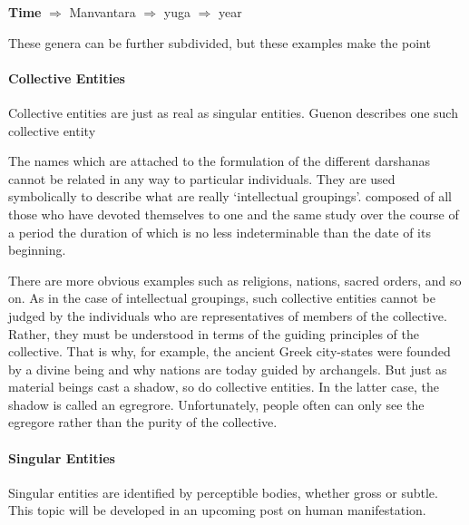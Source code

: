 \textbf{Time} $\Rightarrow $ Manvantara $\Rightarrow $ yuga $\Rightarrow $ year

These genera can be further subdivided, but these examples make the point

\paragraph{Collective Entities}
Collective entities are just as real as singular entities. Guenon describes one such collective entity

\begin{quotex}
The names which are attached to the formulation of the different darshanas cannot be related in any way to particular individuals. They are used symbolically to describe what are really `intellectual groupings'. composed of all those who have devoted themselves to one and the same study over the course of a period the duration of which is no less indeterminable than the date of its beginning. 

\end{quotex}
There are more obvious examples such as religions, nations, sacred orders, and so on. As in the case of intellectual groupings, such collective entities cannot be judged by the individuals who are representatives of members of the collective. Rather, they must be understood in terms of the guiding principles of the collective. That is why, for example, the ancient Greek city-states were founded by a divine being and why nations are today guided by archangels. But just as material beings cast a shadow, so do collective entities. In the latter case, the shadow is called an egregrore. Unfortunately, people often can only see the egregore rather than the purity of the collective.

\paragraph{Singular Entities}
Singular entities are identified by perceptible bodies, whether gross or subtle. This topic will be developed in an upcoming post on human manifestation.



